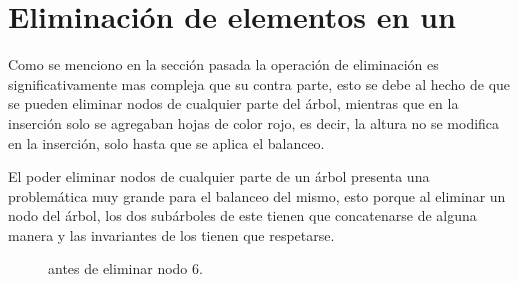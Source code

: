 \section{Eliminación de elementos en un {\arn}}

Como se menciono en la secci\'on pasada la operaci\'on de eliminaci\'on es significativamente mas
compleja que su contra parte, esto se debe al hecho de que se pueden eliminar nodos de cualquier
parte del \'arbol, mientras que en la inserci\'on solo se agregaban hojas de color rojo, es decir,
la altura no se modifica en la inserción\cite{RBTypes}, solo hasta que se aplica el balanceo.

El poder eliminar nodos de cualquier parte de un \'arbol presenta una problemática muy grande para
el balanceo del mismo, esto porque al eliminar un nodo del \'arbol, los dos subárboles de este
tienen que concatenarse de alguna manera y las invariantes de los {\arns} tienen que respetarse.

\begin{figure}
\centering
\captionsetup{justification=centering}
\caption{{\Arn antes de eliminar nodo 6.}}
\label{arbolRB_4}
\end{figure}

